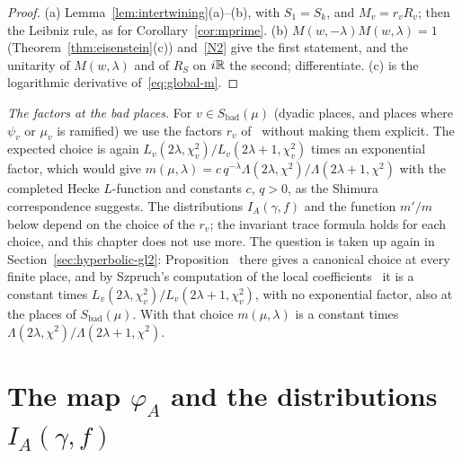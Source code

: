\begin{proof}
(a) Lemma~\ref{lem:intertwining}(a)--(b), with $S_1=S_k$, and
$M_v=r_vR_v$; then the Leibniz rule, as for Corollary~\ref{cor:mprime}.
(b) $M(w,-\lambda)M(w,\lambda)=1$ (Theorem~\ref{thm:eisenstein}(c))
and~\ref{N2} give the first statement, and the unitarity of $M(w,\lambda)$
and of $R_S$ on $i\mathbb{R}$ the second; differentiate. (c) is the logarithmic
derivative of~\eqref{eq:global-m}.
\end{proof}

\begin{remarkrev}\label{rem:bad-places}
\emph{The factors at the bad places.} For $v\in S_{\mathrm{bad}}(\mu)$
(dyadic places, and places where $\psi_v$ or $\mu_v$ is ramified) we use
the factors $r_v$ of~\cite{Li12a} without making them explicit. The
expected choice is again $L_v(2\lambda,\chi_v^2)/L_v(2\lambda+1,\chi_v^2)$
times an exponential factor, which would give
$m(\mu,\lambda)=c\,q^{-\lambda}\Lambda(2\lambda,\chi^2)/\Lambda(2\lambda+1,
\chi^2)$ with the completed Hecke $L$-function and constants $c$, $q>0$,
as the Shimura correspondence suggests. The distributions $I_A(\gamma,f)$ and the function $m'/m$
below depend on the choice of the $r_v$; the invariant trace formula
holds for each choice, and this chapter does not use more. The question
is taken up again in Section~\ref{sec:hyperbolic-gl2}:
Proposition~\normref{} there gives a canonical choice at every finite
place, and by Szpruch's computation of the local
coefficients~\cite{Sz09,Sz16} it is a constant times
$L_v(2\lambda,\chi_v^2)/L_v(2\lambda+1,\chi_v^2)$, with no exponential
factor, also at the places of $S_{\mathrm{bad}}(\mu)$. With that choice
$m(\mu,\lambda)$ is a constant times $\Lambda(2\lambda,\chi^2)/
\Lambda(2\lambda+1,\chi^2)$.
\end{remarkrev}

\section{The map \texorpdfstring{$\varphi_A$}{phi\_A} and the
distributions \texorpdfstring{$I_A(\gamma,f)$}{I\_A(gamma,f)}}
\label{sec:IAgamma}

